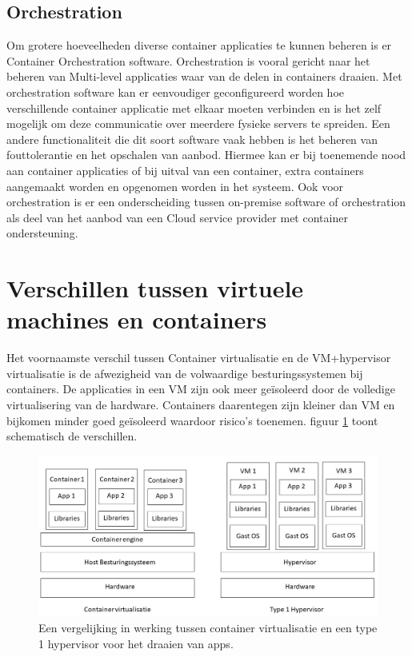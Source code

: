 \subsection{Orchestration}
Om grotere hoeveelheden diverse container applicaties te kunnen beheren is er Container Orchestration software. Orchestration is vooral gericht naar het beheren van Multi-level applicaties waar van de delen in containers draaien. Met orchestration software kan er eenvoudiger geconfigureerd worden hoe verschillende container applicatie met elkaar moeten verbinden en is het zelf mogelijk om deze communicatie over meerdere fysieke servers te spreiden. Een andere functionaliteit die dit soort software vaak hebben is het beheren van fouttolerantie en het opschalen van aanbod. Hiermee kan er bij toenemende nood aan container applicaties of  bij uitval van een container, extra containers aangemaakt worden en opgenomen worden in het systeem. Ook voor orchestration is er een onderscheiding tussen on-premise software of orchestration als deel van het aanbod van een Cloud service provider met container ondersteuning\autocite{Casalicchio2020,Truyen2019}.


\section{Verschillen tussen virtuele machines en containers}
Het voornaamste verschil tussen Container virtualisatie en de VM+hypervisor virtualisatie is de afwezigheid van de volwaardige besturingssystemen bij containers. De applicaties in een VM zijn ook meer geïsoleerd door de volledige virtualisering van de hardware. Containers daarentegen zijn kleiner dan VM en bijkomen minder goed geïsoleerd waardoor risico’s toenemen. figuur \ref{fig:containerVShypervisor} toont schematisch de verschillen.

\begin{figure}[h]
    \includegraphics[width=\linewidth]{img/containerVShyper.jpg}
    \caption[Vergelijking container virtualisatie en type 1 hypervisor]{Een vergelijking in werking tussen container virtualisatie en een type 1 hypervisor voor het draaien van apps.}
    \label{fig:containerVShypervisor}
    \centering
\end{figure}

